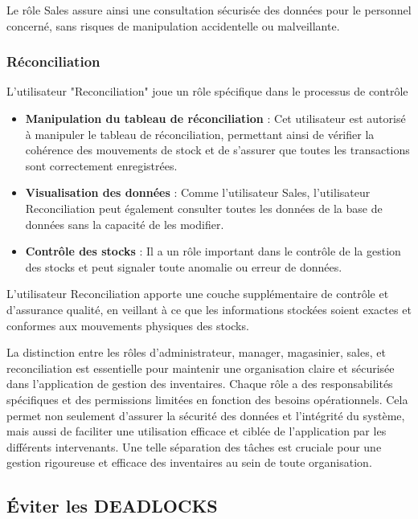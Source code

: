 \documentclass[a4paper, oneside, 12pt, final]{extreport}
\begin{document}
Le rôle Sales assure ainsi une consultation sécurisée des données pour le personnel concerné, sans risques de manipulation accidentelle ou malveillante.

\subsubsection{Réconciliation}

L'utilisateur "Reconciliation" joue un rôle spécifique dans le processus de contrôle 
\begin{itemize}
    \item \textbf{Manipulation du tableau de réconciliation} : Cet utilisateur est autorisé à manipuler le tableau de réconciliation, permettant ainsi de vérifier la cohérence des mouvements de stock et de s'assurer que toutes les transactions sont correctement enregistrées.
    \item \textbf{Visualisation des données} : Comme l'utilisateur Sales, l'utilisateur Reconciliation peut également consulter toutes les données de la base de données sans la capacité de les modifier.
    \item \textbf{Contrôle des stocks} : Il a un rôle important dans le contrôle de la gestion des stocks et peut signaler toute anomalie ou erreur de données.
\end{itemize}

L'utilisateur Reconciliation apporte une couche supplémentaire de contrôle et d'assurance qualité, en veillant à ce que les informations stockées soient exactes et conformes aux mouvements physiques des stocks.



La distinction entre les rôles d'administrateur, manager, magasinier, sales, et reconciliation est essentielle pour maintenir une organisation claire et sécurisée dans l'application de gestion des inventaires. Chaque rôle a des responsabilités spécifiques et des permissions limitées en fonction des besoins opérationnels. Cela permet non seulement d'assurer la sécurité des données et l'intégrité du système, mais aussi de faciliter une utilisation efficace et ciblée de l'application par les différents intervenants. Une telle séparation des tâches est cruciale pour une gestion rigoureuse et efficace des inventaires au sein de toute organisation.

\subsection{Éviter les DEADLOCKS}
\end{document}
